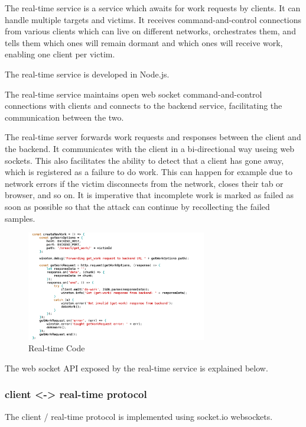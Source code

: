 The real-time service is a service which awaits for work requests by clients.
It can handle multiple targets and victims. It receives command-and-control
connections from various clients which can live on different networks,
orchestrates them, and tells them which ones will remain dormant and which ones
will receive work, enabling one client per victim.

The real-time service is developed in Node.js.

The real-time service maintains open web socket command-and-control connections
with clients and connects to the backend service, facilitating the
communication between the two.

The real-time server forwards work requests and responses between the client
and the backend. It communicates with the client in a bi-directional way useing web
sockets. This also facilitates the ability to detect that a client has gone away,
which is registered as a failure to do work. This can happen for example due to network
errors if the victim disconnects from the network, closes their tab or browser,
and so on. It is imperative that incomplete work is marked as failed as soon as
possible so that the attack can continue by recollecting the failed samples.

\begin{figure}[H] \caption{Real-time Code} \centering
\includegraphics[width=0.7\textwidth]{diagrams/realtime.png}\end{figure}

The web socket API exposed by the real-time service is explained below.

\subsubsection{client <-> real-time protocol}

The client / real-time protocol is implemented using socket.io websockets.

